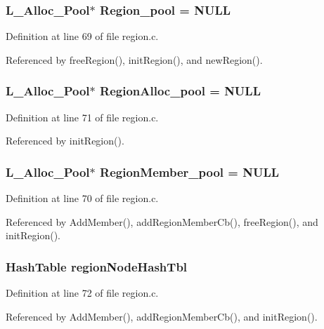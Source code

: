 \subsubsection{\setlength{\rightskip}{0pt plus 5cm}\bf{L\_\-Alloc\_\-Pool}$\ast$ \bf{Region\_\-pool} = \bf{NULL}}\label{region_8c_4d5f483920804fe14be6a864cd58f714}




Definition at line 69 of file region.c.

Referenced by free\-Region(), init\-Region(), and new\-Region().
\subsubsection{\setlength{\rightskip}{0pt plus 5cm}\bf{L\_\-Alloc\_\-Pool}$\ast$ \bf{Region\-Alloc\_\-pool} = \bf{NULL}}\label{region_8c_cb9d86cc7095b99777615691d1b01e64}




Definition at line 71 of file region.c.

Referenced by init\-Region().
\subsubsection{\setlength{\rightskip}{0pt plus 5cm}\bf{L\_\-Alloc\_\-Pool}$\ast$ \bf{Region\-Member\_\-pool} = \bf{NULL}}\label{region_8c_9f2f8bae1c2ca89a413b6a51a373ed02}




Definition at line 70 of file region.c.

Referenced by Add\-Member(), add\-Region\-Member\-Cb(), free\-Region(), and init\-Region().
\subsubsection{\setlength{\rightskip}{0pt plus 5cm}\bf{Hash\-Table} \bf{region\-Node\-Hash\-Tbl}}\label{region_8c_5da076713e396adacb647c9d8b501754}




Definition at line 72 of file region.c.

Referenced by Add\-Member(), add\-Region\-Member\-Cb(), and init\-Region().